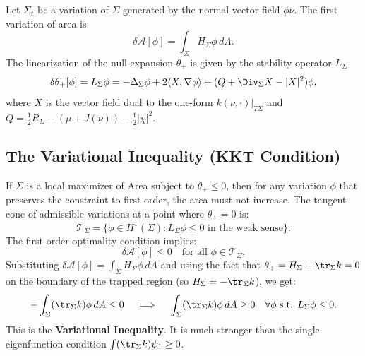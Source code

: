 Let $\Sigma_t$ be a variation of $\Sigma$ generated by the normal vector field $\phi \nu$. The first variation of area is:
\begin{equation}
    \delta \mathcal{A}[\phi] = \int_\Sigma H_\Sigma \phi \, dA.
\end{equation}
The linearization of the null expansion $\theta_+$ is given by the stability operator $L_\Sigma$:
\begin{equation}
    \delta \theta_+[\phi] = L_\Sigma \phi = -\Delta_\Sigma \phi + 2\langle X, \nabla \phi \rangle + (Q + \Div_\Sigma X - |X|^2)\phi,
\end{equation}
where $X$ is the vector field dual to the one-form $k(\nu, \cdot)|_{T\Sigma}$ and $Q = \frac{1}{2}R_\Sigma - (\mu + J(\nu)) - \frac{1}{2}|\chi|^2$.

\subsection{The Variational Inequality (KKT Condition)}

\begin{theorem}\label{thm:KKT_Derivation}
If $\Sigma$ is a local maximizer of Area subject to $\theta_+ \le 0$, then for any variation $\phi$ that preserves the constraint to first order, the area must not increase.
The tangent cone of admissible variations at a point where $\theta_+ = 0$ is:
\begin{equation}
    \mathcal{T}_\Sigma = \{ \phi \in H^1(\Sigma) : L_\Sigma \phi \le 0 \text{ in the weak sense} \}.
\end{equation}
The first order optimality condition implies:
\begin{equation}
    \delta \mathcal{A}[\phi] \le 0 \quad \text{for all } \phi \in \mathcal{T}_\Sigma.
\end{equation}
Substituting $\delta \mathcal{A}[\phi] = \int_\Sigma H_\Sigma \phi \, dA$ and using the fact that $\theta_+ = H_\Sigma + \tr_\Sigma k = 0$ on the boundary of the trapped region (so $H_\Sigma = -\tr_\Sigma k$), we get:
\begin{equation}\label{eq:KKT_Condition_Derivation}
    -\int_\Sigma (\tr_\Sigma k) \phi \, dA \le 0 \quad \implies \quad \int_\Sigma (\tr_\Sigma k) \phi \, dA \ge 0 \quad \forall \phi \text{ s.t. } L_\Sigma \phi \le 0.
\end{equation}
This is the \textbf{Variational Inequality}. It is much stronger than the single eigenfunction condition $\int (\tr_\Sigma k) \psi_1 \ge 0$.
\end{theorem}

